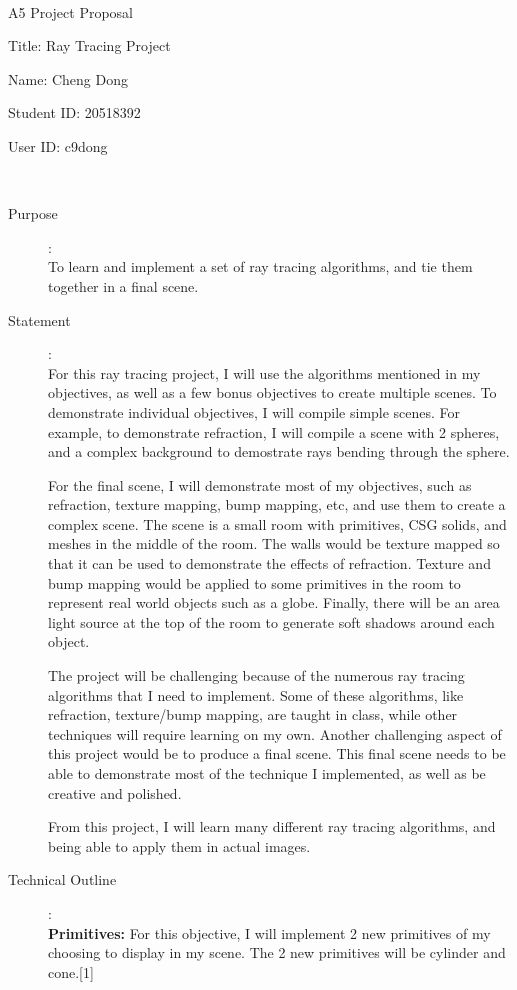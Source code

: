 \documentclass {article}
\begin{document}
~\vfill
\begin{center}
\Large

A5 Project Proposal

Title: Ray Tracing Project

Name: Cheng Dong

Student ID: 20518392

User ID: c9dong
\end{center}
\vfill ~\vfill~
\newpage
{}
\begin{description}
\item[Purpose]:\\
  To learn and implement a set of ray tracing algorithms, and tie them together in a final scene.

\item[Statement]:\\
  For this ray tracing project, I will use the algorithms mentioned in my objectives, as well as a few bonus objectives to create multiple scenes. To demonstrate individual objectives, I will compile simple scenes. For example, to demonstrate refraction, I will compile a scene with 2 spheres, and a complex background to demostrate rays bending through the sphere.

  For the final scene, I will demonstrate most of my objectives, such as refraction, texture mapping, bump mapping, etc, and use them to create a complex scene. The scene is a small room with primitives, CSG solids, and meshes in the middle of the room. The walls would be texture mapped so that it can be used to demonstrate the effects of refraction. Texture and bump mapping would be applied to some primitives in the room to represent real world objects such as a globe. Finally, there will be an area light source at the top of the room to generate soft shadows around each object.

  The project will be challenging because of the numerous ray tracing algorithms that I need to implement. Some of these algorithms, like refraction, texture/bump mapping, are taught in class, while other techniques will require learning on my own. Another challenging aspect of this project would be to produce a final scene. This final scene needs to be able to demonstrate most of the technique I implemented, as well as be creative and polished.

  From this project, I will learn many different ray tracing algorithms, and being able to apply them in actual images.

\item[Technical Outline]:\\
    {\bf Primitives: }
    For this objective, I will implement 2 new primitives of my choosing to display in my scene. The 2 new primitives will be cylinder and cone.[1]


\end{description}
\end{document}
